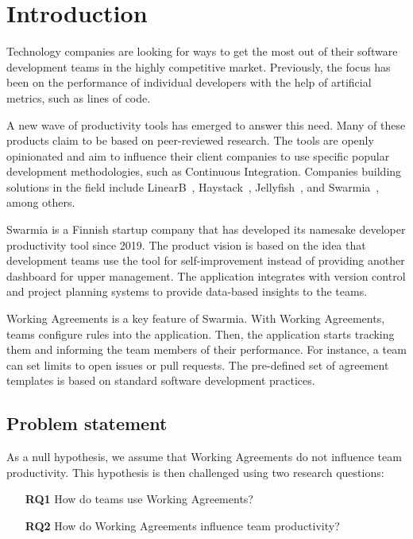 \chapter{Introduction}

Technology companies are looking for ways to get the most out of their software development teams in the highly competitive market. Previously, the focus has been on the performance of individual developers with the help of artificial metrics, such as lines of code. 

A new wave of productivity tools has emerged to answer this need. Many of these products claim to be based on peer-reviewed research. The tools are openly opinionated and aim to influence their client companies to use specific popular development methodologies, such as Continuous Integration. Companies building solutions in the field include LinearB~\cite{linearb_developer_nodate}, Haystack~\cite{haystack_haystack_nodate}, Jellyfish~\cite{jellyfish_align_nodate}, and Swarmia~\cite{swarmia_gain_nodate}, among others.

Swarmia is a Finnish startup company that has developed its namesake developer productivity tool since 2019. The product vision is based on the idea that development teams use the tool for self-improvement instead of providing another dashboard for upper management. The application integrates with version control and project planning systems to provide data-based insights to the teams. 

Working Agreements is a key feature of Swarmia. With Working Agreements, teams configure rules into the application. Then, the application starts tracking them and informing the team members of their performance. For instance, a team can set limits to open issues or pull requests. The pre-defined set of agreement templates is based on standard software development practices. 

\section{Problem statement}

As a null hypothesis, we assume that Working Agreements do not influence team productivity. This hypothesis is then challenged using two research questions: 

\begin{enumerate}
    \item[{\bf RQ1}] How do teams use Working Agreements?
    \item[{\bf RQ2}] How do Working Agreements influence team productivity?
\end{enumerate}

